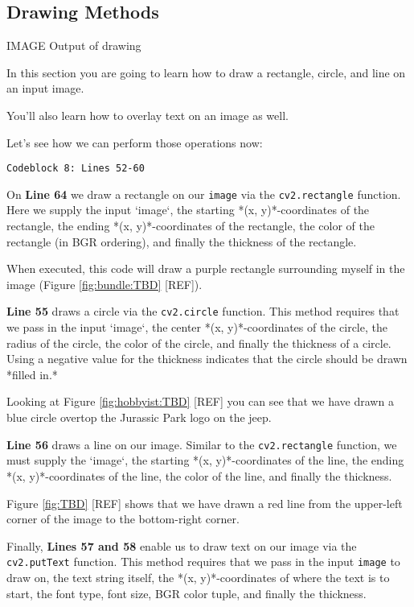 \subsection{Drawing Methods}

IMAGE Output of drawing

In this section you are going to learn how to draw a rectangle, circle, and line on an input image.

You’ll also learn how to overlay text on an image as well.

Let’s see how we can perform those operations now:

\begin{verbatim}
Codeblock 8: Lines 52-60
\end{verbatim}

On \textbf{Line 64} we draw a rectangle on our \texttt{image} via the \texttt{cv2.rectangle} function. Here we supply the input `image`, the starting *(x, y)*-coordinates of the rectangle, the ending *(x, y)*-coordinates of the rectangle, the color of the rectangle (in BGR ordering), and finally the thickness of the rectangle.

When executed, this code will draw a purple rectangle surrounding myself in the image (Figure \ref{fig:bundle:TBD} [REF]).

\textbf{Line 55} draws a circle via the \texttt{cv2.circle} function. This method requires that we pass in the input `image`, the center *(x, y)*-coordinates of the circle, the radius of the circle, the color of the circle, and finally the thickness of a circle. Using a negative value for the thickness indicates that the circle should be drawn *filled in.*

Looking at Figure \ref{fig:hobbyist:TBD} [REF] you can see that we have drawn a blue circle overtop the Jurassic Park logo on the jeep.

\textbf{Line 56} draws a line on our image. Similar to the \texttt{cv2.rectangle} function, we must supply the `image`, the starting *(x, y)*-coordinates of the line, the ending *(x, y)*-coordinates of the line, the color of the line, and finally the thickness.

Figure \ref{fig:TBD} [REF] shows that we have drawn a red line from the upper-left corner of the image to the bottom-right corner.

Finally, \textbf{Lines 57 and 58} enable us to draw text on our image via the \texttt{cv2.putText} function. This method requires that we pass in the input \texttt{image} to draw on, the text string itself, the *(x, y)*-coordinates of where the text is to start, the font type, font size, BGR color tuple, and finally the thickness.

